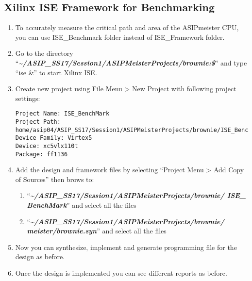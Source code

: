 \subsection{Xilinx ISE Framework for Benchmarking}
\begin{enumerate}[resume]
\item To accurately measure the critical path and area of the ASIPmeister CPU, you can use ISE\_Benchmark folder instead of ISE\_Framework folder.
\item Go to the directory ``\emph{\small{\textbf{\textasciitilde/ASIP\_SS17/Session1/ASIPMeisterProjects/brownie:\$}}}'' and type ``ise \&'' to start Xilinx ISE.
\item Create new project using File Menu \textgreater{} New Project with following project settings:
\begin{lstlisting}
Project Name: ISE_BenchMark
Project Path:
home/asip04/ASIP_SS17/Session1/ASIPMeisterProjects/brownie/ISE_BenchMark
Device Family: Virtex5
Device: xc5vlx110t
Package: ff1136
\end{lstlisting}
\item Add the design and framework files by selecting ``Project Menu \textgreater{} Add Copy of Sources'' then brows to:
	\begin{enumerate}
		\def\labelenumii{\alph{enumii}.}
		\item
		``\emph{\small{\textbf{\textasciitilde/ASIP\_SS17/Session1/ASIPMeisterProjects/brownie/
				ISE\_}}} \emph{\textbf{BenchMark}}'' and select all the files
		\item
		``\emph{\small{\textbf{\textasciitilde/ASIP\_SS17/Session1/ASIPMeisterProjects/brownie/
				meister/brownie.syn}}}'' and select all the files
	\end{enumerate}
\item Now you can synthesize, implement and generate programming file for the design as before.
\item Once the design is implemented you can see different reports as before.
\end{enumerate}
